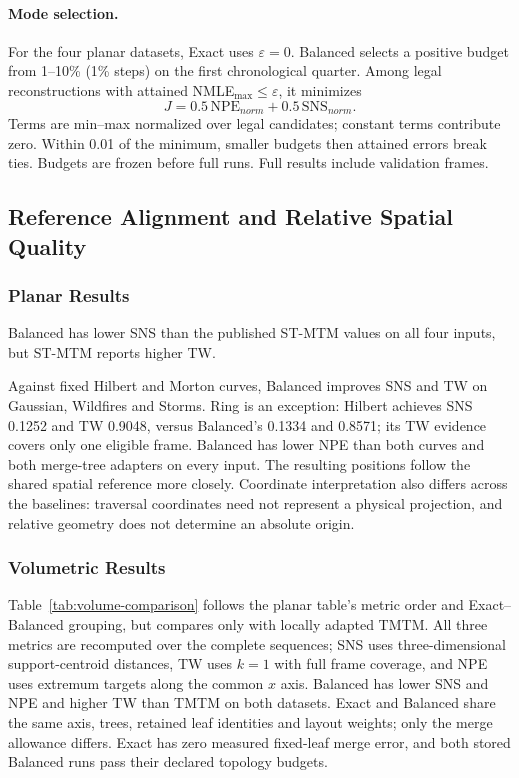 \documentclass[review]{vgtc}
\begin{document}
\paragraph{Mode selection.}
For the four planar datasets, Exact uses $\varepsilon=0$. Balanced selects a positive budget from 1--10\% (1\% steps) on the first chronological quarter. Among legal reconstructions with attained NMLE$_{\max}\le\varepsilon$, it minimizes
\begin{equation}\label{eq:balanced-validation-score}
J=0.5\,\mathrm{NPE}_{norm}+0.5\,\mathrm{SNS}_{norm}.
\end{equation}
Terms are min--max normalized over legal candidates; constant terms contribute zero. Within 0.01 of the minimum, smaller budgets then attained errors break ties. Budgets are frozen before full runs. Full results include validation frames.

\subsection{Reference Alignment and Relative Spatial Quality}\label{sec:reference-results}
\subsubsection{Planar Results}
Balanced has lower SNS than the published ST-MTM values on all four inputs, but ST-MTM reports higher TW. 

Against fixed Hilbert and Morton curves, Balanced improves SNS and TW on Gaussian, Wildfires and Storms. Ring is an exception: Hilbert achieves SNS 0.1252 and TW 0.9048, versus Balanced's 0.1334 and 0.8571; its TW evidence covers only one eligible frame. Balanced has lower NPE than both curves and both merge-tree adapters on every input. The resulting positions follow the shared spatial reference more closely. Coordinate interpretation also differs across the baselines: traversal coordinates need not represent a physical projection, and relative geometry does not determine an absolute origin.

\subsubsection{Volumetric Results}

Table~\ref{tab:volume-comparison} follows the planar table's metric order and Exact--Balanced grouping, but compares only with locally adapted TMTM. All three metrics are recomputed over the complete sequences; SNS uses three-dimensional support-centroid distances, TW uses $k=1$ with full frame coverage, and NPE uses extremum targets along the common $x$ axis. Balanced has lower SNS and NPE and higher TW than TMTM on both datasets. Exact and Balanced share the same axis, trees, retained leaf identities and layout weights; only the merge allowance differs. Exact has zero measured fixed-leaf merge error, and both stored Balanced runs pass their declared topology budgets. 
\end{document}
